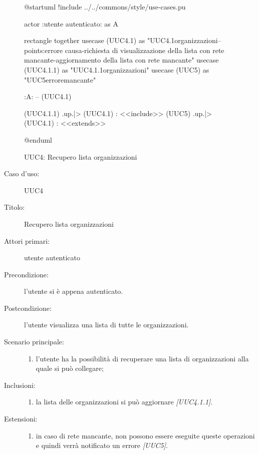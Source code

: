 \documentclass[../../../analisi-dei-requisiti.tex]{subfiles}
\begin{document}
\begin{figure}[H]
  \centering
  \begin{plantuml}
  @startuml
  !include ../../commons/style/use-cases.pu

  actor :utente autenticato: as A

  rectangle {
    together {
      usecase (UUC4.1) as "UUC4.1\nVisualizzazione\nlista organizzazioni\n--\nExtension points:\nVisualizzazione errore causa\n-richiesta di visualizzazione della lista con rete mancante\n-aggiornamento della lista con rete mancante"
      usecase (UUC4.1.1) as "UUC4.1.1\nAggiornamento\nlista organizzazioni"
      usecase (UUC5) as "UUC5\nVisualizzazione errore\nrete mancante"
    }
  }

  :A: -- (UUC4.1)

  (UUC4.1.1) .up.|> (UUC4.1) : <<include>>
  (UUC5) .up.|> (UUC4.1) : <<extends>>

  @enduml
  \end{plantuml}
  \caption{UUC4: Recupero lista organizzazioni}
  \label{fig:uuc4}
\end{figure}

\begin{description}
  \item[Caso d’uso:] UUC4
  \item[Titolo:] Recupero lista organizzazioni
  \item[Attori primari:] utente autenticato
  \item[Precondizione:] l'utente si è appena autenticato.
  \item[Postcondizione:] l'utente visualizza una lista di tutte le organizzazioni.
  \item[Scenario principale:]
        \begin{enumerate}
          \item l'utente ha la possibilità di recuperare una lista di organizzazioni alla quale si può collegare;
        \end{enumerate}
  \item[Inclusioni:]
        \begin{enumerate}
          \item la lista delle organizzazioni si può aggiornare \emph{[UUC4.1.1]}.
        \end{enumerate}
  \item[Estensioni:]
        \begin{enumerate}
          \item in caso di rete mancante, non possono essere eseguite queste operazioni e quindi verrà notificato un errore \emph{[UUC5]}.
        \end{enumerate}
\end{description}
\end{document}
